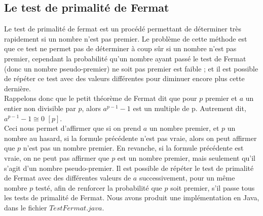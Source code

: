 		\subsection{Le test de primalité de Fermat}
			Le test de primalité de fermat est un procédé permettant de déterminer très rapidement si un nombre n'est pas premier. Le problème de cette méthode est que ce test ne permet pas de déterminer à coup sûr si un nombre n'est pas premier, cependant la probabilité qu'un nombre ayant passé le test de Fermat (donc un nombre pseudo-premier) ne soit pas premier est faible ; et il est possible de répéter ce test avec des valeurs différentes pour diminuer encore plus cette dernière.\\
			Rappelons donc que le petit théorème de Fermat dit que pour $p$ premier et $a$ un entier non divisible par $p$, alors $a^{p-1} - 1$ est un multiple de p. Autrement dit, $a^{p-1}-1\cong{0}$ $[p]$.\\
			Ceci nous permet d'affirmer que si on prend $a$ un nombre premier, et $p$ un nombre au hasard, si la formule précédente n'est pas vraie, alors on peut affirmer que $p$ n'est pas un nombre premier. En revanche, si la formule précédente est vraie, on ne peut pas affirmer que $p$ est un nombre premier, mais seulement qu'il s'agit d'un nombre pseudo-premier. Il est possible de répéter le test de primalité de Fermat avec des différentes valeurs de $a$ successivement, pour un même nombre $p$ testé, afin de renforcer la probabilité que $p$ soit premier, s'il passe tous les tests de primalité de Fermat. Nous avons produit une implémentation en Java, dans le fichier $TestFermat.java$.
